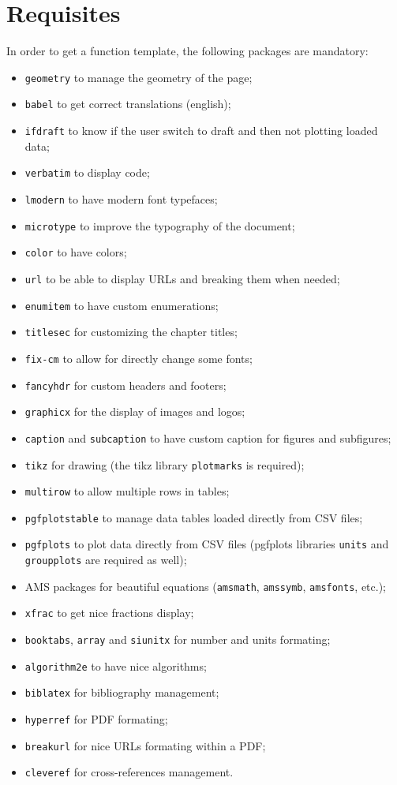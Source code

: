 \documentclass[a4paper,12pt,oneside]{report}
\begin{document}
	\section{Requisites}
			In order to get a function template, the following packages are mandatory:
			\begin{itemize}
				\item \texttt{geometry} to manage the geometry of the page;
				\item \texttt{babel} to get correct translations (english);
				\item \texttt{ifdraft} to know if the user switch to draft and then not plotting loaded data;
				\item \texttt{verbatim} to display code;
				\item \texttt{lmodern} to have modern font typefaces;
				\item \texttt{microtype} to improve the typography of the document;
				\item \texttt{color} to have colors;
				\item \texttt{url} to be able to display URLs and breaking them when needed;
				\item \texttt{enumitem} to have custom enumerations;
				\item \texttt{titlesec} for customizing the chapter titles;
				\item \texttt{fix-cm} to allow for directly change some fonts;
				\item \texttt{fancyhdr} for custom headers and footers;
				\item \texttt{graphicx} for the display of images and logos;
				\item \texttt{caption} and \texttt{subcaption} to have custom caption for figures and subfigures;
				\item \texttt{tikz} for drawing (the tikz library \texttt{plotmarks} is required);
				\item \texttt{multirow} to allow multiple rows in tables;
				\item \texttt{pgfplotstable} to manage data tables loaded directly from CSV files;
				\item \texttt{pgfplots} to plot data directly from CSV files (pgfplots libraries \texttt{units} and \texttt{groupplots} are required as well);
				\item AMS packages for beautiful equations (\texttt{amsmath}, \texttt{amssymb}, \texttt{amsfonts}, etc.);
				\item \texttt{xfrac} to get nice fractions display;
				\item \texttt{booktabs}, \texttt{array} and \texttt{siunitx} for number and units formating;
				\item \texttt{algorithm2e} to have nice algorithms;
				\item \texttt{biblatex} for bibliography management;
				\item \texttt{hyperref} for PDF formating;
				\item \texttt{breakurl} for nice URLs formating within a PDF;
				\item \texttt{cleveref} for cross-references management.
			\end{itemize}
\end{document}
